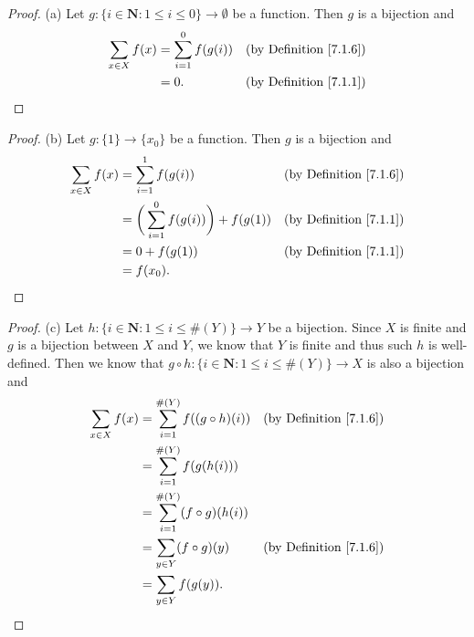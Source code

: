 \begin{proof}{(a)}
    Let \(g : \{i \in \mathbf{N} : 1 \leq i \leq 0\} \to \emptyset\) be a function.
    Then \(g\) is a bijection and
    \begin{align*}
        \sum_{x \in X} f(x) & = \sum_{i = 1}^0 f(g(i)) & \text{(by Definition \ref{7.1.6})} \\
                            & = 0.                     & \text{(by Definition \ref{7.1.1})}
    \end{align*}
\end{proof}

\begin{proof}{(b)}
    Let \(g : \{1\} \to \{x_0\}\) be a function.
    Then \(g\) is a bijection and
    \begin{align*}
        \sum_{x \in X} f(x) & = \sum_{i = 1}^1 f(g(i))                       & \text{(by Definition \ref{7.1.6})} \\
                            & = \bigg(\sum_{i = 1}^0 f(g(i))\bigg) + f(g(1)) & \text{(by Definition \ref{7.1.1})} \\
                            & = 0 + f(g(1))                                  & \text{(by Definition \ref{7.1.1})} \\
                            & = f(x_0).
    \end{align*}
\end{proof}

\begin{proof}{(c)}
    Let \(h : \{i \in \mathbf{N} : 1 \leq i \leq \#(Y)\} \to Y\) be a bijection.
    Since \(X\) is finite and \(g\) is a bijection between \(X\) and \(Y\), we know that \(Y\) is finite and thus such \(h\) is well-defined.
    Then we know that \(g \circ h : \{i \in \mathbf{N} : 1 \leq i \leq \#(Y)\} \to X\) is also a bijection and
    \begin{align*}
        \sum_{x \in X} f(x) & = \sum_{i = 1}^{\#(Y)} f((g \circ h)(i)) & \text{(by Definition \ref{7.1.6})} \\
                            & = \sum_{i = 1}^{\#(Y)} f(g(h(i)))                                             \\
                            & = \sum_{i = 1}^{\#(Y)} (f \circ g)(h(i))                                      \\
                            & = \sum_{y \in Y} (f \circ g)(y)          & \text{(by Definition \ref{7.1.6})} \\
                            & = \sum_{y \in Y} f(g(y)).
    \end{align*}
\end{proof}


